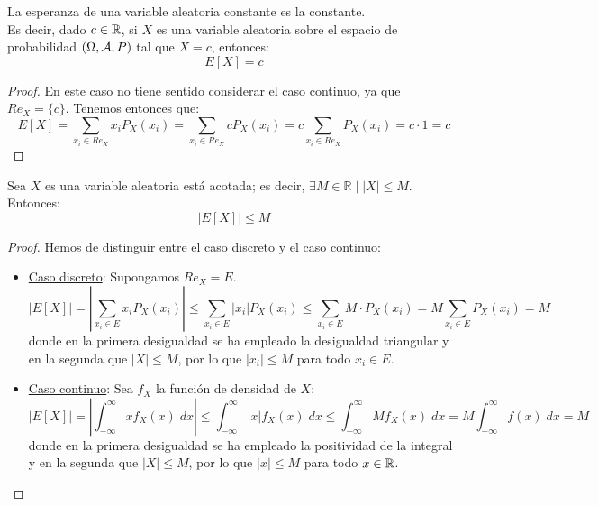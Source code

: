\begin{prop}\label{prop:Esp_De_Constante}
    La esperanza de una variable aleatoria constante es la constante.\\
    Es decir, dado $c\in \mathbb R$, si $X$ es una variable aleatoria sobre el espacio de probabilidad $(\Omega, \mathcal{A}, P)$ tal que
    $X=c$, entonces:
    \begin{equation*}
        E[X]=c
    \end{equation*}
\end{prop}
\begin{proof}
    En este caso no tiene sentido considerar el caso continuo, ya que $Re_X=\{c\}$. Tenemos entonces que:
    \begin{equation*}
        E[X] = \sum_{x_i\in Re_X}x_iP_X(x_i) = \sum_{x_i\in Re_X}cP_X(x_i) = c\sum_{x_i\in Re_X}P_X(x_i) = c\cdot 1=c
    \end{equation*}
\end{proof}

\begin{prop}
    Sea $X$ es una variable aleatoria está acotada; es decir, $\exists M\in \mathbb{R}\mid |X|\leq M$. Entonces:
    \begin{equation*}
        |E[X]|\leq M
    \end{equation*}
\end{prop}
\begin{proof}
    Hemos de distinguir entre el caso discreto y el caso continuo:
    \begin{itemize}
        \item \underline{Caso discreto}: Supongamos $Re_X = E$.
        \begin{equation*}
            \left|E[X]\right| = \left|\sum_{x_i\in E} x_iP_X(x_i)\right| \leq \sum_{x_i\in E} \left|x_i\right|P_X(x_i) \leq \sum_{x_i\in E} M\cdot P_X(x_i) = M\sum_{x_i\in E} P_X(x_i) = M
        \end{equation*}
        donde en la primera desigualdad se ha empleado la desigualdad triangular y en la segunda que $|X|\leq M$, por lo que $|x_i|\leq M$ para todo $x_i\in E$.

        \item \underline{Caso continuo}: Sea $f_X$ la función de densidad de $X$:
        \begin{equation*}
            \left|E[X]\right| =  \left|\int_{-\infty}^\infty xf_X(x)\;dx\right|
            \leq \int_{-\infty}^\infty \left|x\right|f_X(x)\;dx
            \leq 
            \int_{-\infty}^\infty Mf_X(x)\;dx = M\int_{-\infty}^\infty f(x)\;dx = M
        \end{equation*}
        donde en la primera desigualdad se ha empleado la positividad de la integral y en la segunda que $|X|\leq M$, por lo que $|x|\leq M$ para todo $x\in \mathbb R$.
    \end{itemize}
\end{proof}

